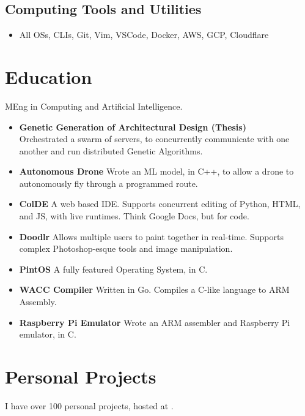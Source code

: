 \documentclass{jcgcv}
\begin{document}
\begin{column}
\subsection{Computing Tools and Utilities}
\begin{itemize}
  \item All OSs, CLIs, Git, Vim, VSCode, Docker, AWS, GCP, Cloudflare
\end{itemize}

\section{Education}

MEng in Computing and Artificial Intelligence.

\begin{itemize}
  \item \textbf{Genetic Generation of Architectural Design (Thesis)} \\
        Orchestrated a swarm of servers, to concurrently communicate with
        one another and run distributed Genetic Algorithms.
  \item \textbf{Autonomous Drone} Wrote an ML model, in C++, to allow a drone
        to autonomously fly through a programmed route.
  \item \textbf{ColDE} A web based IDE. Supports concurrent editing of Python,
        HTML, and JS, with live runtimes. Think Google Docs, but for code.
  \item \textbf{Doodlr} Allows multiple users to paint together in real-time. Supports
        complex Photoshop-esque tools and image manipulation.
  \item \textbf{PintOS} A fully featured Operating System, in C.
  \item \textbf{WACC Compiler} Written in Go. Compiles a C-like language to ARM
        Assembly.
  \item \textbf{Raspberry Pi Emulator} Wrote an ARM assembler and Raspberry
        Pi emulator, in C.
\end{itemize}

\section{Personal Projects}

I have over 100 personal projects, hosted at
.


\end{column}
\end{document}
